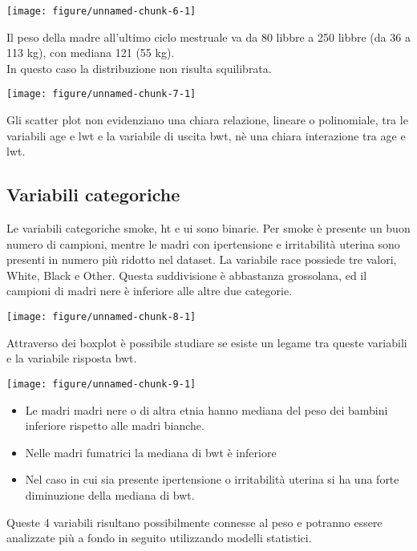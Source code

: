 \documentclass{article}\usepackage[]{graphicx}\usepackage[]{color}
\makeatletter
\def\maxwidth{ %
  \ifdim\Gin@nat@width>\linewidth
    \linewidth
  \else
    \Gin@nat@width
  \fi
}
\newenvironment{knitrout}{}{} %
\makeatother
\begin{document}
\begin{knitrout}
\color{fgcolor}
\texttt{[image: figure/unnamed-chunk-6-1]} 
\end{knitrout}

Il peso della madre all'ultimo ciclo mestruale va da 80 libbre a 250 libbre (da 36 a 113 kg), con mediana 121 (55 kg).
\\In questo caso la distribuzione non risulta squilibrata.

\begin{knitrout}
\color{fgcolor}
\texttt{[image: figure/unnamed-chunk-7-1]} 
\end{knitrout}

Gli scatter plot non evidenziano una chiara relazione, lineare o polinomiale, tra le variabili age e lwt e la variabile di uscita bwt, nè una chiara interazione tra age e lwt.

\subsection{Variabili categoriche}
Le variabili categoriche smoke, ht e ui sono binarie.
Per smoke è presente un buon numero di campioni, mentre le madri con ipertensione e irritabilità uterina sono presenti in numero più ridotto nel dataset.
La variabile race possiede tre valori, White, Black e Other. Questa suddivisione è abbastanza grossolana, ed il campioni di madri nere è inferiore alle altre due categorie.

\begin{knitrout}
\color{fgcolor}
\texttt{[image: figure/unnamed-chunk-8-1]} 
\end{knitrout}

Attraverso dei boxplot è possibile studiare se esiste un legame tra queste variabili e la variabile risposta bwt.

\begin{knitrout}
\color{fgcolor}
\texttt{[image: figure/unnamed-chunk-9-1]} 
\end{knitrout}

\begin{itemize}
\item Le madri madri nere o di altra etnia hanno mediana del peso dei bambini inferiore rispetto alle madri bianche.
\item Nelle madri fumatrici la mediana di bwt è inferiore
\item Nel caso in cui sia presente ipertensione o irritabilità uterina si ha una forte diminuzione della mediana di bwt. 
\end{itemize}
Queste 4 variabili risultano possibilmente connesse al peso e potranno essere analizzate più a fondo in seguito utilizzando modelli statistici.
\end{document}

